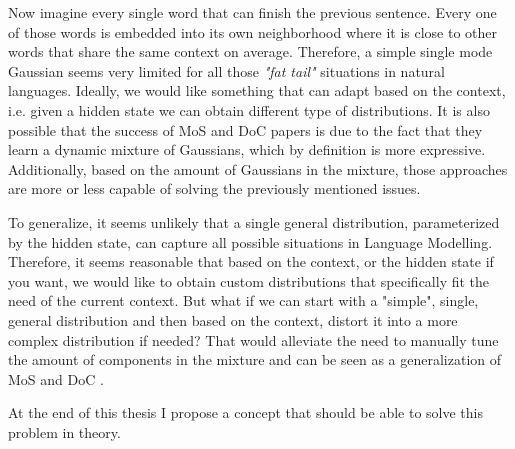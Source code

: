 Now imagine every single word that can finish the previous sentence. Every one of those words is embedded into its own neighborhood where it is close to other words that share the same context on average. Therefore, a simple single mode Gaussian seems very limited for all those \emph{"fat tail"} situations in natural languages. Ideally, we would like something that can adapt based on the context, i.e. given a hidden state we can obtain different type of distributions. It is also possible that the success of MoS \cite{yang2017breaking} and DoC \cite{takase2018direct} papers is due to the fact that they learn a dynamic mixture of Gaussians, which by definition is more expressive. Additionally, based on the amount of Gaussians in the mixture, those approaches are more or less capable of solving the previously mentioned issues.

To generalize, it seems unlikely that a single general distribution, parameterized by the hidden state, can capture all possible situations in Language Modelling. Therefore, it seems reasonable that based on the context, or the hidden state if you want, we would like to obtain custom distributions that specifically fit the need of the current context. But what if we can start with a "simple", single, general distribution and then based on the context, distort it into a more complex distribution if needed? That would alleviate the need to manually tune the amount of components in the mixture and can be seen as a generalization of MoS \cite{yang2017breaking} and DoC \cite{takase2018direct}.

At the end of this thesis I propose a concept that should be able to solve this problem in theory.
